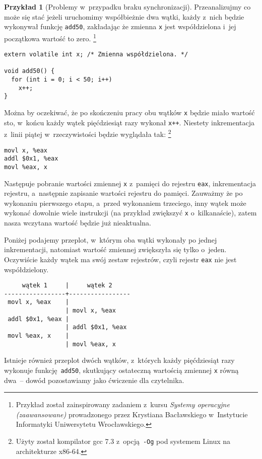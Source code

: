 \documentclass[shortabstract]{iithesis}
\theoremstyle{definition} \newtheorem*{definition}{Definicja}
\theoremstyle{definition} \newtheorem*{example}{Przykład}
\theoremstyle{definition} \newtheorem*{remark}{Uwaga}
\begin{document}
\begin{example}[Problemy w~przypadku braku synchronizacji]
Przeanalizujmy co może się stać jeżeli uruchomimy współbieżnie dwa wątki, każdy z~nich będzie wykonywał funkcję
\texttt{add50}, zakładając że zmienna \texttt{x} jest współdzielona i~jej początkowa wartość to zero.
\footnote{Przykład został zainspirowany zadaniem z~kursu \textit{Systemy operacyjne (zaawansowane)} prowadzonego
przez Krystiana Bacławskiego w~Instytucie Informatyki Uniwersytetu Wrocławskiego.}

\begin{lstlisting}
extern volatile int x; /* Zmienna współdzielona. */

void add50() {
  for (int i = 0; i < 50; i++)
    x++;
}
\end{lstlisting}
Można by oczekiwać, że po skończeniu pracy obu wątków \texttt{x} będzie miało wartość sto, w~końcu
każdy wątek pięćdziesiąt razy wykonał \texttt{x++}. Niestety inkrementacja
z~linii piątej w~rzeczywistości będzie wyglądała tak: \footnote{Użyty został kompilator gcc 7.3 z~opcją \texttt{-Og}
pod systemem Linux na architekturze x86-64.}
\begin{lstlisting}
movl x, %eax
addl $0x1, %eax
movl %eax, x
\end{lstlisting}
Następuje pobranie wartości zmiennej \texttt{x} z~pamięci do rejestru \texttt{eax}, inkrementacja rejestru,
a~następnie zapisanie wartości rejestru do pamięci. Zauważmy że po wykonaniu pierwszego etapu, a~przed wykonaniem
trzeciego, inny wątek może wykonać dowolnie wiele instrukcji (na przykład zwiększyć \texttt{x} o~kilkanaście),
zatem nasza wczytana wartość będzie już nieaktualna.

Poniżej podajemy przeplot, w~którym oba wątki wykonały po jednej inkrementacji, natomiast wartość zmiennej
zwiększyła się tylko o~jeden. Oczywiście każdy wątek ma swój zestaw rejestrów, czyli rejestr
\texttt{eax} nie jest współdzielony.

\begin{lstlisting}
     wątek 1     |     wątek 2
-----------------+-----------------
 movl x, %eax    |
                 | movl x, %eax
 addl $0x1, %eax |
                 | addl $0x1, %eax
 movl %eax, x    |
                 | movl %eax, x
\end{lstlisting}

Istnieje również przeplot dwóch wątków, z~których każdy pięćdziesiąt razy wykonuje funkcję \texttt{add50}, skutkujący
ostateczną wartością zmiennej \texttt{x} równą dwa~-- dowód pozostawiamy jako ćwiczenie dla czytelnika.
\end{example}
\end{document}
